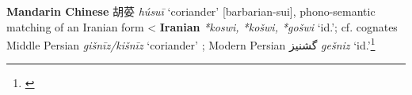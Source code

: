 \begin{etymology}\label{ety:husui}
\textbf{Mandarin Chinese} {胡荽} \textit{húsuī} `coriander' [barbarian-sui], phono-semantic matching of an Iranian form
< \textbf{Iranian} \textit{*koswi, *košwi, *gošwi} `id.'; cf. cognates Middle Persian \textit{gišnīz/kišnīz} `coriander'  ; Modern Persian گشنیز \textit{gešniz} `id.'\footnote{\textcite{laufer_sino-iranica_1919}}
\end{etymology}